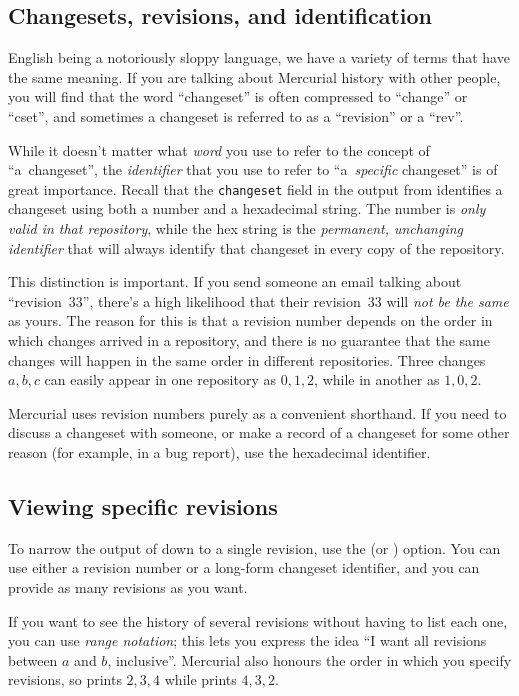 \subsection{Changesets, revisions, and identification}

English being a notoriously sloppy language, we have a variety of
terms that have the same meaning.  If you are talking about Mercurial
history with other people, you will find that the word ``changeset''
is often compressed to ``change'' or ``cset'', and sometimes a
changeset is referred to as a ``revision'' or a ``rev''.

While it doesn't matter what \emph{word} you use to refer to the
concept of ``a~changeset'', the \emph{identifier} that you use to
refer to ``a~\emph{specific} changeset'' is of great importance.
Recall that the \texttt{changeset} field in the output from
 identifies a changeset using both a number and a
hexadecimal string.  The number is \emph{only valid in that
  repository}, while the hex string is the \emph{permanent, unchanging
  identifier} that will always identify that changeset in every copy
of the repository.

This distinction is important.  If you send someone an email talking
about ``revision~33'', there's a high likelihood that their
revision~33 will \emph{not be the same} as yours.  The reason for this
is that a revision number depends on the order in which changes
arrived in a repository, and there is no guarantee that the same
changes will happen in the same order in different repositories.
Three changes $a,b,c$ can easily appear in one repository as $0,1,2$,
while in another as $1,0,2$.

Mercurial uses revision numbers purely as a convenient shorthand.  If
you need to discuss a changeset with someone, or make a record of a
changeset for some other reason (for example, in a bug report), use
the hexadecimal identifier.

\subsection{Viewing specific revisions}

To narrow the output of  down to a single revision, use the
 (or ) option.  You can use either a
revision number or a long-form changeset identifier, and you can
provide as many revisions as you want.  

If you want to see the history of several revisions without having to
list each one, you can use \emph{range notation}; this lets you
express the idea ``I want all revisions between $a$ and $b$,
inclusive''.
Mercurial also honours the order in which you specify revisions, so
 prints $2,3,4$ while 
prints $4,3,2$.

